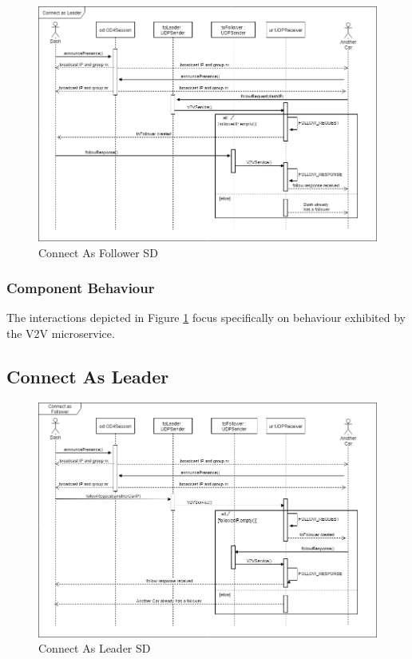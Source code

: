 \documentclass[12pt]{article}
\begin{document}
\begin{figure}[ht!]
\centering
\includegraphics[width=\linewidth]{Diagrams/ConnectAsFollower.png}
\caption{Connect As Follower SD}
\label{fig:connectasfollower}
\end{figure}

\subsubsection{Component Behaviour}
The interactions depicted in Figure \ref{fig:connectasfollower} focus specifically on behaviour exhibited by the V2V microservice.  \par


\subsection{Connect As Leader}
\begin{figure}[ht!]
\centering
\includegraphics[width=\linewidth]{Diagrams/ConnectAsLeader.png}
\caption{Connect As Leader SD}
\label{fig:connectasleader}
\end{figure}
\pagebreak
\end{document}
